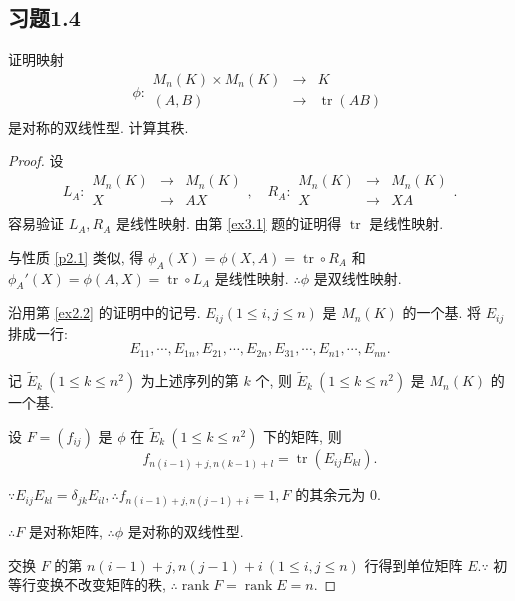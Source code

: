 \documentclass{ctexart}
\begin{document}
\subsection{习题1.4}
\begin{exercisec}%
    证明映射
    \[\phi:\begin{array}{rcl}
        M_n(K)\times M_n(K) & \to & K \\
        (A,B) & \to & \operatorname{tr}(AB) \\
    \end{array}\]
    是对称的双线性型. 计算其秩.
\end{exercisec}
\begin{proof}
    设
    \[L_A:\begin{array}{rcl}
            M_n(K) & \to & M_n(K) \\
            X & \to & AX \\
        \end{array},\quad R_A:\begin{array}{rcl}
            M_n(K) & \to & M_n(K) \\
            X & \to & XA \\
        \end{array}.\]
    容易验证 $L_A,R_A$ 是线性映射. 由第 \ref{ex3.1} 题的证明得 $\operatorname{tr}$ 是线性映射.
    
    与性质 \ref{p2.1} 类似, 得 $\phi_A(X)=\phi(X,A)=\operatorname{tr}\circ R_A$ 和 $\phi_A'(X)=\phi(A,X)=\operatorname{tr}\circ L_A$ 是线性映射. $\therefore\phi$ 是双线性映射.

    沿用第 \ref{ex2.2} 的证明中的记号. $E_{ij}(1\leq i,j\leq n)$ 是 $M_n(K)$ 的一个基. 将 $E_{ij}$ 排成一行:
    \[E_{11},\cdots,E_{1n},E_{21},\cdots,E_{2n},E_{31},\cdots,E_{n1},\cdots,E_{nn}.\]

    记 $\tilde{E}_k\ (1\leq k\leq n^2)$ 为上述序列的第 $k$ 个, 则 $\tilde{E}_k\ (1\leq k\leq n^2)$ 是 $M_n(K)$ 的一个基.
    
    设 $F=(f_{ij})$ 是 $\phi$ 在 $\tilde{E}_k\ (1\leq k\leq n^2)$ 下的矩阵, 则
    \[f_{n(i-1)+j,n(k-1)+l}=\operatorname{tr}(E_{ij}E_{kl}).\]

    $\because E_{ij}E_{kl}=\delta_{jk}E_{il},\therefore f_{n(i-1)+j,n(j-1)+i}=1,F$ 的其余元为 $0$.

    $\therefore F$ 是对称矩阵, $\therefore\phi$ 是对称的双线性型.

    交换 $F$ 的第 $n(i-1)+j,n(j-1)+i\ (1\leq i,j\leq n)$ 行得到单位矩阵 $E.\because$ 初等行变换不改变矩阵的秩, $\therefore\operatorname{rank}F=\operatorname{rank}E=n$.
\end{proof}
\end{document}
